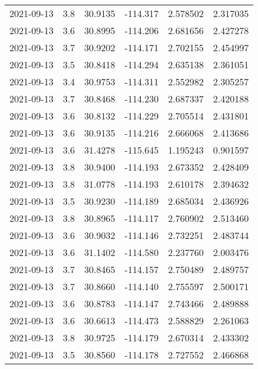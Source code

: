 \begin{tabular}{lrrrrr}
2021-09-13 &       3.8 &  30.9135 &  -114.317 &         2.578502 &         2.317035 \\
2021-09-13 &       3.6 &  30.8995 &  -114.206 &         2.681656 &         2.427278 \\
2021-09-13 &       3.7 &  30.9202 &  -114.171 &         2.702155 &         2.454997 \\
2021-09-13 &       3.5 &  30.8418 &  -114.294 &         2.635138 &         2.361051 \\
2021-09-13 &       3.4 &  30.9753 &  -114.311 &         2.552982 &         2.305257 \\
2021-09-13 &       3.7 &  30.8468 &  -114.230 &         2.687337 &         2.420188 \\
2021-09-13 &       3.6 &  30.8132 &  -114.229 &         2.705514 &         2.431801 \\
2021-09-13 &       3.6 &  30.9135 &  -114.216 &         2.666068 &         2.413686 \\
2021-09-13 &       3.6 &  31.4278 &  -115.645 &         1.195243 &         0.901597 \\
2021-09-13 &       3.8 &  30.9400 &  -114.193 &         2.673352 &         2.428409 \\
2021-09-13 &       3.8 &  31.0778 &  -114.193 &         2.610178 &         2.394632 \\
2021-09-13 &       3.5 &  30.9230 &  -114.189 &         2.685034 &         2.436926 \\
2021-09-13 &       3.8 &  30.8965 &  -114.117 &         2.760902 &         2.513460 \\
2021-09-13 &       3.6 &  30.9032 &  -114.146 &         2.732251 &         2.483744 \\
2021-09-13 &       3.6 &  31.1402 &  -114.580 &         2.237760 &         2.003476 \\
2021-09-13 &       3.7 &  30.8465 &  -114.157 &         2.750489 &         2.489757 \\
2021-09-13 &       3.7 &  30.8660 &  -114.140 &         2.755597 &         2.500171 \\
2021-09-13 &       3.6 &  30.8783 &  -114.147 &         2.743466 &         2.489888 \\
2021-09-13 &       3.6 &  30.6613 &  -114.473 &         2.588829 &         2.261063 \\
2021-09-13 &       3.8 &  30.9725 &  -114.179 &         2.670314 &         2.433302 \\
2021-09-13 &       3.5 &  30.8560 &  -114.178 &         2.727552 &         2.466868 \\

\end{tabular}
